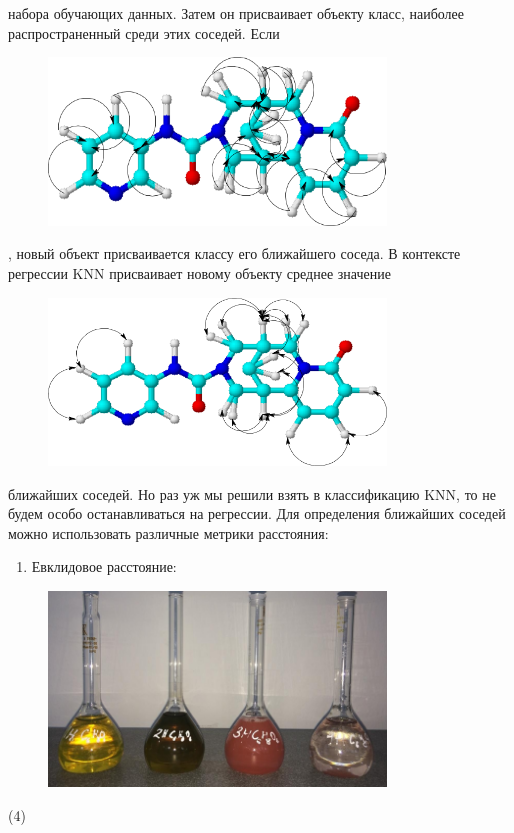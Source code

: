 набора обучающих данных. Затем он присваивает объекту класс, наиболее
распространенный среди этих соседей. Если
\begin{figure}[H]
	\centering
	\includegraphics[width=0.8\textwidth]{assets/13}
	\caption*{}
\end{figure}, новый объект присваивается классу
его ближайшего соседа. В контексте регрессии KNN присваивает новому
объекту среднее значение \begin{figure}[H]
	\centering
	\includegraphics[width=0.8\textwidth]{assets/11}
	\caption*{}
\end{figure} ближайших
соседей. Но раз уж мы решили взять в классификацию KNN, то не будем
особо останавливаться на регрессии. Для определения ближайших соседей
можно использовать различные метрики расстояния:

\begin{enumerate}
\def\labelenumi{\arabic{enumi}.}
\item
  Евклидовое расстояние:
\end{enumerate}

\begin{figure}[H]
	\centering
	\includegraphics[width=0.8\textwidth]{assets/14}
	\caption*{}
\end{figure} (4)

